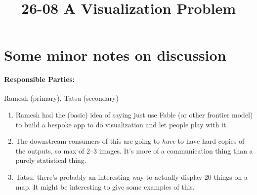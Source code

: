 \documentclass[11pt]{article}
\begin{document}
\title{26-08 A Visualization Problem}

\maketitle

\section{Some minor notes on discussion}

\paragraph{Responsible Parties:} Ramesh (primary), Tatsu (secondary)

\begin{enumerate}[1.]
\item Ramesh had the (basic) idea of saying just use Fable (or other
  frontier model) to build a bespoke app to do visualization and let people
  play with it.
\item The downstream consumers of this are going to \emph{have} to have hard
  copies of the outputs, so max of 2--3 images.
  It's more of a communication thing than a purely statistical thing.
\item Tatsu: there's probably an interesting way to actually display 20
  things on a map.
  It might be interesting to give some examples of this.
\end{enumerate}
\end{document}
